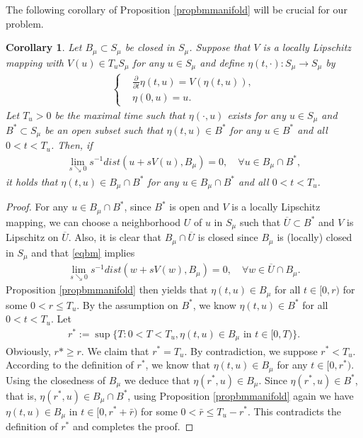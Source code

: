 \documentclass[10pt,a4paper]{article}
\newtheorem{corollary}[theorem]{Corollary}
\theoremstyle{definition} \theoremstyle{remark}
\numberwithin{equation}{section}
\begin{document}
The following corollary of Proposition \ref{propbmmanifold} will be crucial for our problem.

\begin{corollary} \label{corbm}
	Let $B_\mu \subset S_\mu$ be  closed in $S_\mu$. 
	Suppose that $V$ is a locally Lipschitz mapping with $V(u) \in T_uS_\mu$ for any $u \in S_\mu$ and define $\eta(t,\cdot): S_\mu \to S_\mu$ by
	\begin{align*}
		\left\{
		\begin{aligned}
			& \frac{\partial}{\partial t}\eta(t,u) = V(\eta(t,u)), \\
			& \eta(0,u) = u.
		\end{aligned}
		\right.
	\end{align*}
    Let $T_u > 0$ be the maximal time such that $\eta(\cdot,u)$ exists for any $u \in S_\mu$ and $B^* \subset S_\mu$ be an open subset such that $\eta(t,u) \in B^*$ for any $u \in B^*$ and all $0 < t < T_u$. Then, if
	\begin{align} \label{eqbm}
		\lim_{s \searrow 0}s^{-1}dist(u + sV(u),B_\mu) = 0, \quad \forall u \in B_\mu \cap B^*,
	\end{align}
	it holds that $\eta(t,u) \in B_\mu \cap B^*$ for any $u \in B_\mu \cap B^*$ and all $0 < t < T_u$.
\end{corollary}

\begin{proof}
	For any $u \in B_\mu \cap B^*$, since $B^*$ is open and $V$ is a locally Lipschitz mapping, we can choose a neighborhood $U$ of $u$ in $S_\mu$ such that $\overline{U} \subset B^*$ and $V$ is Lipschitz on $\overline{U}$. Also, it is clear that $B_\mu \cap \overline{U}$ is closed since $B_\mu$ is (locally) closed in $S_\mu$ and that \eqref{eqbm} implies
	\begin{align*}
		\lim_{s \searrow 0}s^{-1}dist(w + sV(w),B_\mu) = 0, \quad \forall w \in \overline{U} \cap B_\mu.
	\end{align*}
	Proposition \ref{propbmmanifold} then yields that $\eta(t,u) \in B_\mu$ for all $t \in [0,r)$ for some $0 < r \leq T_u$. By the assumption on $B^*$, we know $\eta(t,u) \in B^*$ for all $0 < t < T_u$. Let
	\begin{align*}
		r^* := \sup\bigl\{T: 0 < T < T_u, \eta(t,u) \in B_\mu \text{ in } t \in [0,T)\bigr\}.
	\end{align*}
    Obviously, $r* \geq r$. We claim that $r^* = T_u$. By contradiction, we suppose $r^* < T_u$. According to the definition of $r^*$, we know that $\eta(t,u) \in B_\mu$ for any $t \in [0,r^*)$. Using the closedness of $B_\mu$ we deduce that $\eta(r^*,u) \in  B_\mu$.  Since $\eta(r^*,u) \in  B^*$, that is, $\eta(r^*,u) \in  B_\mu \cap B^*$, using Proposition \ref{propbmmanifold} again we have $\eta(t,u) \in B_\mu$ in $t \in [0,r^* + \bar r)$ for some $0 < \bar r \leq T_u-r^*$. This contradicts the definition of $r^*$ and completes the proof.
\end{proof}
\end{document}
